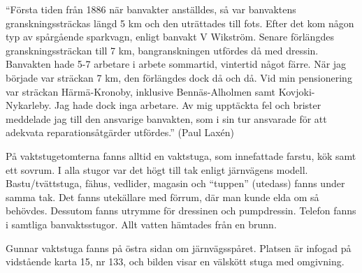 
``Första tiden från 1886 när banvakter anställdes, så var banvaktens granskningssträckas längd 5 km och den uträttades till fots. Efter det kom någon typ av spårgående sparkvagn, enligt banvakt V Wikström. Senare förlängdes granskningssträckan till 7 km, bangranskningen utfördes då med dressin. Banvakten hade 5-7 arbetare i arbete sommartid, vintertid något färre. När jag började var sträckan 7 km, den förlängdes dock då och då. Vid min pensionering var sträckan Härmä-Kronoby, inklusive Bennäs-Alholmen samt Kovjoki-Nykarleby. Jag hade dock inga arbetare. Av mig upptäckta fel och brister meddelade jag till den ansvarige banvakten, som i sin tur ansvarade för att adekvata reparationsåtgärder utfördes.'' (Paul Laxén)

På vaktstugetomterna fanns alltid en vaktstuga, som innefattade farstu, kök samt ett sovrum. I alla stugor var det högt till tak enligt järnvägens modell. Bastu/tvättstuga, fähus, vedlider, magasin och ``tuppen'' (utedass) fanns under samma tak. Det fanns utekällare med förrum, där man kunde elda om så behövdes. Dessutom fanns utrymme för dressinen och pumpdressin. Telefon fanns i samtliga banvaktsstugor. Allt vatten hämtades från en brunn.

Gunnar vaktstuga fanns på östra sidan om järnvägsspåret. Platsen är infogad på vidstående karta 15, nr 133, och bilden visar en välskött stuga med omgivning.

